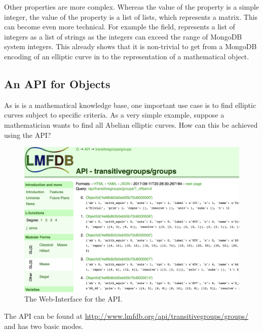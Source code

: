 Other properties are more complex.
Whereas the value of the  property is a simple integer, the value of
the  property is a list of lists, which represents a matrix. 
This can become even more technical. 
For example the  field, \lmfdb represents
a list of integers as a list of strings as the integers can exceed the range of MongoDB system
integers.  This already shows that it is non-trivial to get from a MongoDB encoding of an elliptic
curve in \lmfdb to the representation of a mathematical object. 


\subsection{An API for  \lmfdb Objects}\label{sec:sota:api}

As \lmfdb is is a mathematical knowledge base, one important use case is to find elliptic
curves subject to specific criteria. As a very simple example, suppose a mathematician
wants to find all Abelian elliptic curves.  How can this be achieved using the \lmfdb API?

\begin{figure}[h]
  \begin{center}
    \includegraphics[width=\textwidth]{APIScreenshot.png}
  \end{center}

  \caption[The Web-Interface for the \lmfdb API. ]{
    The Web-Interface for the \lmfdb API. 
  }
  \label{fig:apiscreenshot}
\end{figure}
The \lmfdb API can be found at \url{http://www.lmfdb.org/api/transitivegroups/groups/} and has two basic modes. 

